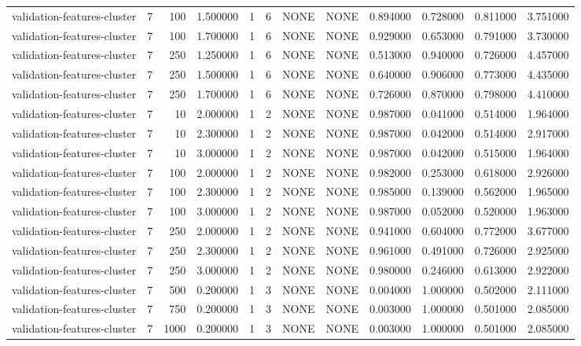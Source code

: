\begin{tabular}{lrrrllllrrrr}
validation-features-cluster & 7 & 100 & 1.500000 & 1 & 6 & NONE & NONE & 0.894000 & 0.728000 & 0.811000 & 3.751000 \\
validation-features-cluster & 7 & 100 & 1.700000 & 1 & 6 & NONE & NONE & 0.929000 & 0.653000 & 0.791000 & 3.730000 \\
validation-features-cluster & 7 & 250 & 1.250000 & 1 & 6 & NONE & NONE & 0.513000 & 0.940000 & 0.726000 & 4.457000 \\
validation-features-cluster & 7 & 250 & 1.500000 & 1 & 6 & NONE & NONE & 0.640000 & 0.906000 & 0.773000 & 4.435000 \\
validation-features-cluster & 7 & 250 & 1.700000 & 1 & 6 & NONE & NONE & 0.726000 & 0.870000 & 0.798000 & 4.410000 \\
validation-features-cluster & 7 & 10 & 2.000000 & 1 & 2 & NONE & NONE & 0.987000 & 0.041000 & 0.514000 & 1.964000 \\
validation-features-cluster & 7 & 10 & 2.300000 & 1 & 2 & NONE & NONE & 0.987000 & 0.042000 & 0.514000 & 2.917000 \\
validation-features-cluster & 7 & 10 & 3.000000 & 1 & 2 & NONE & NONE & 0.987000 & 0.042000 & 0.515000 & 1.964000 \\
validation-features-cluster & 7 & 100 & 2.000000 & 1 & 2 & NONE & NONE & 0.982000 & 0.253000 & 0.618000 & 2.926000 \\
validation-features-cluster & 7 & 100 & 2.300000 & 1 & 2 & NONE & NONE & 0.985000 & 0.139000 & 0.562000 & 1.965000 \\
validation-features-cluster & 7 & 100 & 3.000000 & 1 & 2 & NONE & NONE & 0.987000 & 0.052000 & 0.520000 & 1.963000 \\
validation-features-cluster & 7 & 250 & 2.000000 & 1 & 2 & NONE & NONE & 0.941000 & 0.604000 & 0.772000 & 3.677000 \\
validation-features-cluster & 7 & 250 & 2.300000 & 1 & 2 & NONE & NONE & 0.961000 & 0.491000 & 0.726000 & 2.925000 \\
validation-features-cluster & 7 & 250 & 3.000000 & 1 & 2 & NONE & NONE & 0.980000 & 0.246000 & 0.613000 & 2.922000 \\
validation-features-cluster & 7 & 500 & 0.200000 & 1 & 3 & NONE & NONE & 0.004000 & 1.000000 & 0.502000 & 2.111000 \\
validation-features-cluster & 7 & 750 & 0.200000 & 1 & 3 & NONE & NONE & 0.003000 & 1.000000 & 0.501000 & 2.085000 \\
validation-features-cluster & 7 & 1000 & 0.200000 & 1 & 3 & NONE & NONE & 0.003000 & 1.000000 & 0.501000 & 2.085000 \\

\end{tabular}
